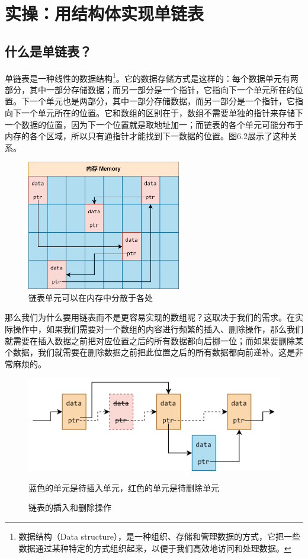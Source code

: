\section{实操：用结构体实现单链表}
\subsection*{什么是单链表？}
单链表是一种线性的数据结构\footnote{数据结构（Data structure），是一种组织、存储和管理数据的方式，它把一些数据通过某种特定的方式组织起来，以便于我们高效地访问和处理数据。}。它的数据存储方式是这样的：每个数据单元有两部分，其中一部分存储数据；而另一部分是一个指针，它指向下一个单元所在的位置。下一个单元也是两部分，其中一部分存储数据，而另一部分是一个指针，它指向下一个单元所在的位置。它和数组的区别在于，数组不需要单独的指针来存储下一个数据的位置，因为下一个位置就是取地址加一；而链表的各个单元可能分布于内存的各个区域，所以只有通指针才能找到下一数据的位置。图6.2展示了这种关系。\par
\begin{figure}[htbp]
    \centering
    \includegraphics[width=0.6\textwidth]{../images/generalized_parts/06_list_in_the_memory_300.png}
    \caption{链表单元可以在内存中分散于各处}
\end{figure}
那么我们为什么要用链表而不是更容易实现的数组呢？这取决于我们的需求。在实际操作中，如果我们需要对一个数组的内容进行频繁的插入、删除操作，那么我们就需要在插入数据之前把对应位置之后的所有数据都向后挪一位；而如果要删除某个数据，我们就需要在删除数据之前把此位置之后的所有数据都向前递补。这是非常麻烦的。\par
\begin{figure}[htbp]
    \centering
    \includegraphics[width=\textwidth]{../images/generalized_parts/06_operation_on_list_300.png}
    \caption{链表的插入和删除操作}
    \footnotesize{蓝色的单元是待插入单元，红色的单元是待删除单元}
\end{figure}
